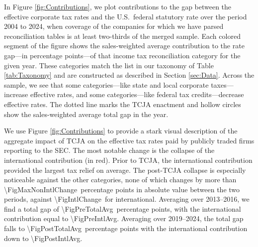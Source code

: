 \documentclass[11pt,letterpaper]{article}
\newcommand{\ShareNum}[1]{\num[round-mode=places,round-precision=1]{#1}}
\begin{document}
In Figure \ref{fig:Contributions}, we plot contributions to the 
gap between the effective corporate tax rates and the U.S.~federal  statutory rate
over the period 2004 to 2024, when coverage of the companies
for which we have parsed reconciliation tables
is at least two-thirds of the merged \citet{CompustatAnnual} sample.
Each colored segment of the figure shows the sales-weighted 
average contribution to the rate gap---in percentage points---of 
that income tax reconciliation category for the given year.
These categories match the list in our taxonomy of Table
\ref{tab:Taxonomy} and are constructed as described in Section
\ref{sec:Data}. 
Across the sample, we see that some categories---like state and local corporate
taxes---increase effective rates, and some categories---like federal tax 
credits---decrease effective rates.
The dotted line marks the TCJA enactment and
hollow circles show the sales-weighted average total gap in the year.

We use Figure \ref{fig:Contributions} to provide a stark visual
description of the aggregate impact of TCJA on the effective tax rates paid
by publicly traded firms reporting to the SEC.
The most notable change is the collapse of the international contribution 
(in red).
Prior to TCJA, the international contribution provided the largest tax relief
on average. The post-TCJA collapse is
especially noticeable against the other categories, none of which
changes by more than \ShareNum{\FigMaxNonIntlChange}\ percentage points
in absolute value between the two periods, against
\ShareNum{\FigIntlChange}\ for international.
Averaging over 2013--2016, 
we find a total gap of 
\ShareNum{\FigPreTotalAvg}\ percentage points, with the international contribution equal to 
\ShareNum{\FigPreIntlAvg}.
Averaging over 2019--2024,
the total gap falls to
\ShareNum{\FigPostTotalAvg}\ percentage points with the international contribution down to
\ShareNum{\FigPostIntlAvg}.
\end{document}
